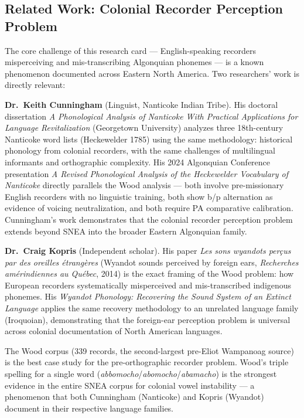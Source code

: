 \subsection{Related Work: Colonial Recorder Perception Problem}

The core challenge of this research card --- English-speaking recorders
misperceiving and mis-transcribing Algonquian phonemes --- is a known
phenomenon documented across Eastern North America. Two researchers' work is
directly relevant:

\textbf{Dr.\ Keith Cunningham} (Linguist, Nanticoke Indian Tribe). His doctoral
dissertation \emph{A Phonological Analysis of Nanticoke With Practical
Applications for Language Revitalization} (Georgetown University) analyzes three
18th-century Nanticoke word lists (Heckewelder 1785) using the same methodology:
historical phonology from colonial recorders, with the same challenges of
multilingual informants and orthographic complexity. His 2024 Algonquian
Conference presentation \emph{A Revised Phonological Analysis of the Heckewelder
Vocabulary of Nanticoke} directly parallels the Wood analysis --- both involve
pre-missionary English recorders with no linguistic training, both show b/p
alternation as evidence of voicing neutralization, and both require PA
comparative calibration. Cunningham's work demonstrates that the colonial
recorder perception problem extends beyond SNEA into the broader Eastern
Algonquian family.

\textbf{Dr.\ Craig Kopris} (Independent scholar). His paper \emph{Les sons
wyandots perçus par des oreilles étrangères} (Wyandot sounds perceived by
foreign ears, \emph{Recherches amérindiennes au Québec}, 2014) is the exact
framing of the Wood problem: how European recorders systematically misperceived
and mis-transcribed indigenous phonemes. His \emph{Wyandot Phonology: Recovering
the Sound System of an Extinct Language} applies the same recovery methodology
to an unrelated language family (Iroquoian), demonstrating that the foreign-ear
perception problem is universal across colonial documentation of North American
languages.

The Wood corpus (339 records, the second-largest pre-Eliot Wampanoag source) is
the best case study for the pre-orthographic recorder problem. Wood's triple
spelling for a single word (\emph{abbomocho}/\emph{abomocho}/\emph{abamacho}) is
the strongest evidence in the entire SNEA corpus for colonial vowel instability
--- a phenomenon that both Cunningham (Nanticoke) and Kopris (Wyandot) document
in their respective language families.

